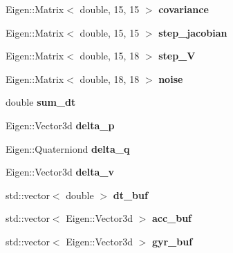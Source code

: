 \begin{DoxyCompactItemize}
\mbox{\label{classIntegrationBase_a7d6a1c1a360e42ea157d27b0e1ff125b}} 
Eigen\+::\+Matrix$<$ double, 15, 15 $>$ {\bfseries covariance}
\item 
\mbox{\label{classIntegrationBase_a6a92785c4b9feee9f9fed868a1144a3e}} 
Eigen\+::\+Matrix$<$ double, 15, 15 $>$ {\bfseries step\+\_\+jacobian}
\item 
\mbox{\label{classIntegrationBase_a26c1b9b880e6f7df4e3031d14b6914c4}} 
Eigen\+::\+Matrix$<$ double, 15, 18 $>$ {\bfseries step\+\_\+V}
\item 
\mbox{\label{classIntegrationBase_aed84dc41be21b6bc1b5d5a68b8009ca2}} 
Eigen\+::\+Matrix$<$ double, 18, 18 $>$ {\bfseries noise}
\item 
\mbox{\label{classIntegrationBase_a1492ef505eea7b9be146af3797ca0cbc}} 
double {\bfseries sum\+\_\+dt}
\item 
\mbox{\label{classIntegrationBase_a7bbab36013cbdfa69214c3a9d807bb0a}} 
Eigen\+::\+Vector3d {\bfseries delta\+\_\+p}
\item 
\mbox{\label{classIntegrationBase_a0dcd9520d1fba9a9d76c451d66e74834}} 
Eigen\+::\+Quaterniond {\bfseries delta\+\_\+q}
\item 
\mbox{\label{classIntegrationBase_a99b821d71ee410e0c33594079a994ff5}} 
Eigen\+::\+Vector3d {\bfseries delta\+\_\+v}
\item 
\mbox{\label{classIntegrationBase_a074615b1712edd7aa6a2d7feafcf8ac3}} 
std\+::vector$<$ double $>$ {\bfseries dt\+\_\+buf}
\item 
\mbox{\label{classIntegrationBase_ac87931ca76365a8b306ad5997152f7a8}} 
std\+::vector$<$ Eigen\+::\+Vector3d $>$ {\bfseries acc\+\_\+buf}
\item 
\mbox{\label{classIntegrationBase_aade8c7e58d35adba9646eb40f8388d28}} 
std\+::vector$<$ Eigen\+::\+Vector3d $>$ {\bfseries gyr\+\_\+buf}
\end{DoxyCompactItemize}


